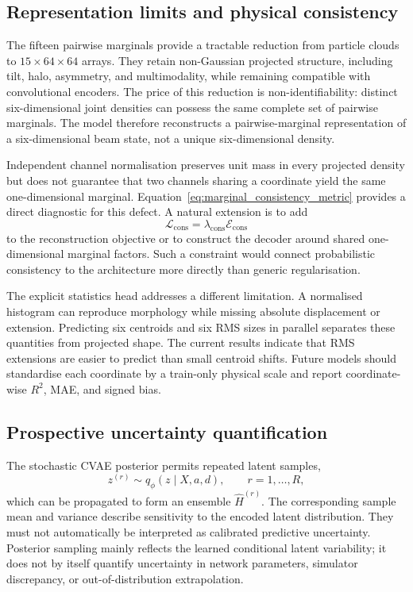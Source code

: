 \subsection{Representation limits and physical consistency}

The fifteen pairwise marginals provide a tractable reduction from particle clouds to $15\times64\times64$ arrays. They retain non-Gaussian projected structure, including tilt, halo, asymmetry, and multimodality, while remaining compatible with convolutional encoders. The price of this reduction is non-identifiability: distinct six-dimensional joint densities can possess the same complete set of pairwise marginals. The model therefore reconstructs a pairwise-marginal representation of a six-dimensional beam state, not a unique six-dimensional density.

Independent channel normalisation preserves unit mass in every projected density but does not guarantee that two channels sharing a coordinate yield the same one-dimensional marginal. Equation~\eqref{eq:marginal_consistency_metric} provides a direct diagnostic for this defect. A natural extension is to add
\begin{equation}
    \mathcal{L}_{\mathrm{cons}}
    =
    \lambda_{\mathrm{cons}}\mathcal{E}_{\mathrm{cons}}
\end{equation}
to the reconstruction objective or to construct the decoder around shared one-dimensional marginal factors. Such a constraint would connect probabilistic consistency to the architecture more directly than generic regularisation.

The explicit statistics head addresses a different limitation. A normalised histogram can reproduce morphology while missing absolute displacement or extension. Predicting six centroids and six RMS sizes in parallel separates these quantities from projected shape. The current results indicate that RMS extensions are easier to predict than small centroid shifts. Future models should standardise each coordinate by a train-only physical scale and report coordinate-wise $R^2$, MAE, and signed bias.

\subsection{Prospective uncertainty quantification}

The stochastic CVAE posterior permits repeated latent samples,
\begin{equation}
    z^{(r)}\sim q_{\phi}(z\mid X,a,d),
    \qquad
    r=1,\ldots,R,
\end{equation}
which can be propagated to form an ensemble $\widehat{H}^{(r)}$. The corresponding sample mean and variance describe sensitivity to the encoded latent distribution. They must not automatically be interpreted as calibrated predictive uncertainty. Posterior sampling mainly reflects the learned conditional latent variability; it does not by itself quantify uncertainty in network parameters, simulator discrepancy, or out-of-distribution extrapolation.

